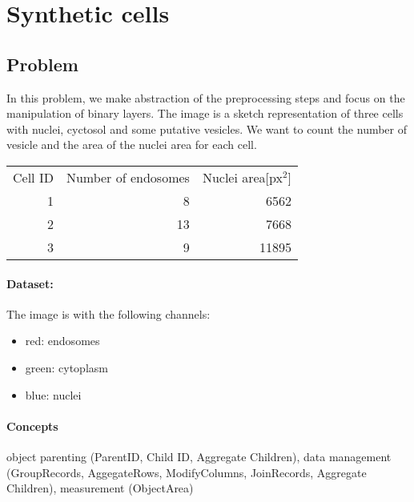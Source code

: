 \section{Synthetic cells}

\subsection*{Problem}
In this problem, we make abstraction of the preprocessing steps and focus on the manipulation of binary layers. The image is a sketch representation of three cells with nuclei, cyctosol and some putative vesicles. We want to count the number of vesicle and the area of the nuclei area for each cell.

\begin{center}
\begin{tabular}{rrr}
    Cell ID& Number of endosomes& Nuclei area[px$^2$]\\
    1&8&6562\\
    2&13&7668\\
    3&9&11895\\
\end{tabular}   
\end{center}

\paragraph{Dataset:} The image is  with the following channels:
\begin{itemize}\setlength\itemsep{0em}
    \item red: endosomes
    \item green: cytoplasm
    \item blue: nuclei
\end{itemize}

\paragraph{Concepts} object parenting (ParentID, Child ID, Aggregate Children), data management (GroupRecords, AggegateRows, ModifyColumns, JoinRecords, Aggregate Children), measurement (ObjectArea)


